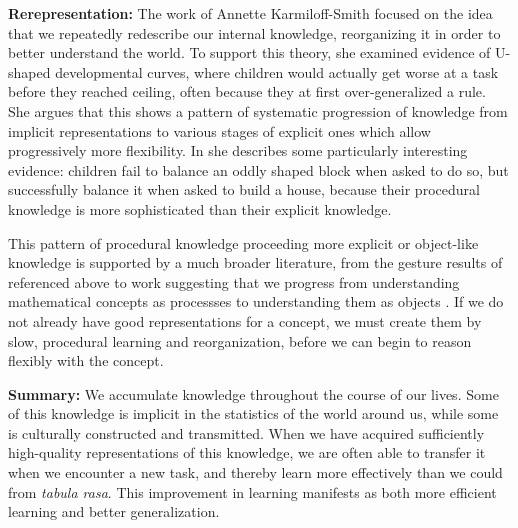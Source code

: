 \documentclass[11pt]{article}
\begin{document}
\textbf{Rerepresentation:} The work of Annette Karmiloff-Smith \citep[e.g.]{Karmiloff-Smith1986, Karmiloff-Smith1992, Clark1993} focused on the idea that we repeatedly redescribe our internal knowledge, reorganizing it in order to better understand the world. To support this theory, she examined evidence of U-shaped developmental curves, where children would actually get worse at a task before they reached ceiling, often because they at first over-generalized a rule. She argues that this shows a pattern of systematic progression of knowledge from implicit representations to various stages of explicit ones which allow progressively more flexibility. In \citet{Karmiloff-Smith1986} she describes some particularly interesting evidence: children fail to balance an oddly shaped block when asked to do so, but successfully balance it when asked to build a house, because their procedural knowledge is more sophisticated than their explicit knowledge. \par 
This pattern of procedural knowledge proceeding more explicit or object-like knowledge is supported by a much broader literature, from the gesture results of \citet{Goldin-Meadow1993} referenced above to work suggesting that we progress from understanding mathematical concepts as processses to understanding them as objects \citep{Dubinsky1991, Hazzan1999}. If we do not already have good representations for a concept, we must create them by slow, procedural learning and reorganization, before we can begin to reason flexibly with the concept. \par 
\textbf{Summary:} We accumulate knowledge throughout the course of our lives. Some of this knowledge is implicit in the statistics of the world around us, while some is culturally constructed and transmitted. When we have acquired sufficiently high-quality representations of this knowledge, we are often able to transfer it when we encounter a new task, and thereby learn more effectively than we could from \textit{tabula rasa}. This improvement in learning manifests as both more efficient learning and better generalization. \par
\end{document}
